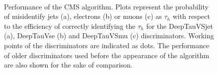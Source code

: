 \documentclass[../main.tex]{subfiles}
\begin{document}
\begin{figure}[h!]
\begin{center}
 \\
\end{center}
\caption{Performance of the CMS \deeptau{} algorithm. Plots represent the probability of misidentify jets (a), electrons (b) or muons (c) as $\tau_h$ with respect to the efficiency of correctly identifying the $\tau_h$ for the DeepTauVSjet (a), DeepTauVse (b) and DeepTauVSmu (c) discriminators. Working points of the discriminators are indicated as dots. The performance of older discriminators used before the appearance of the \deeptau{} algorithm are also shown for the sake of comparison.}
\label{intro:fig:deeptau}
\end{figure}
\end{document}
